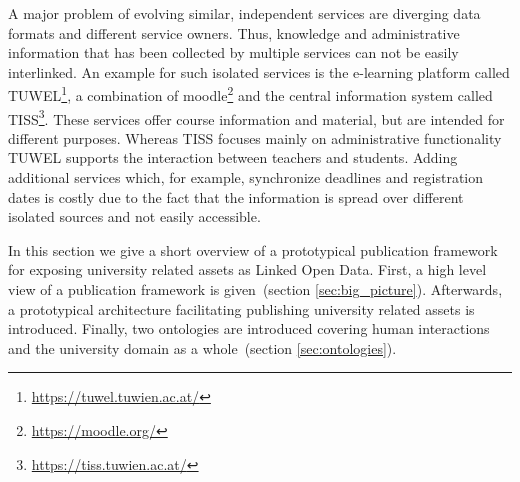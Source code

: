 \documentclass{article}
\begin{document}
A major problem of evolving similar, independent services are diverging data formats and different service owners. Thus, knowledge and administrative information that has been collected by multiple services can not be easily interlinked. An example for such isolated services is the e-learning platform called TUWEL\footnote{\url{https://tuwel.tuwien.ac.at/}}, a combination of moodle\footnote{\url{https://moodle.org/}} and the central information system called TISS\footnote{\url{https://tiss.tuwien.ac.at/}}. These services offer course information and material, but are intended for different purposes. Whereas TISS focuses mainly on administrative functionality TUWEL supports the interaction between teachers and students. 
Adding additional services which, for example, synchronize deadlines and registration dates is costly due to the fact that the information is spread over different isolated sources and not easily accessible. 

In this section we give a short overview of a prototypical publication framework for exposing university related assets as Linked Open Data. First, a high level view of a publication framework is given~(section \ref{sec:big_picture}). Afterwards, a prototypical architecture facilitating publishing university related assets is introduced. Finally, two ontologies are introduced covering human interactions and the university domain as a whole~(section \ref{sec:ontologies}). 
\end{document}
